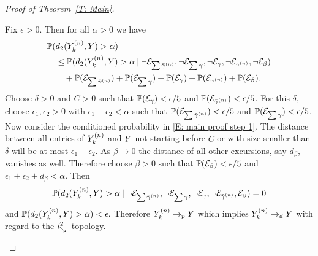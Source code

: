 \begin{proof}[Proof of Theorem~\ref{T: Main}]
\begin{proofpart}
	Fix $\epsilon > 0$. 
	Then for all $\alpha > 0$ we have 
	\begin{equation} \label{E: main proof step 1}
	\begin{aligned}
	&\mathbb{P}( d_{2}(Y^{(n)}_k, Y) > \alpha) \\
	&\quad\leq \mathbb{P}( d_{2}(Y^{(n)}_k, Y) > \alpha \: | \: 
	\neg\mathcal{E}_{\sum\bar{\gamma}^{(n)}}, \neg\mathcal{E}_{\sum\gamma}, \neg\mathcal{E}_{\gamma}, \neg\mathcal{E}_{\bar{\gamma}^{(n)}}, \neg\mathcal{E}_{\beta}) \\
	&\quad\quad + \mathbb{P}(\mathcal{E}_{\sum\bar{\gamma}^{(n)}}) + \mathbb{P}(\mathcal{E}_{\sum\gamma}) + \mathbb{P}(\mathcal{E}_{\gamma}) + \mathbb{P}(\mathcal{E}_{\bar{\gamma}^{(n)}}) + \mathbb{P}(\mathcal{E}_{\beta}).
	\end{aligned}
	\end{equation}
	Choose $\delta > 0$ and $C > 0$ such that $\mathbb{P}(\mathcal{E}_{\gamma}) < \epsilon / 5$ and $\mathbb{P}(\mathcal{E}_{\bar{\gamma}^{(n)}}) < \epsilon / 5$.
	For this $\delta$, choose $\epsilon_1, \epsilon_2 > 0$ with $\epsilon_1 + \epsilon_2 < \alpha$
	such that $\mathbb{P}(\mathcal{E}_{\sum\bar{\gamma}^{(n)}}) < \epsilon / 5$ and $\mathbb{P}(\mathcal{E}_{\sum\gamma}) < \epsilon / 5$.
	Now consider the conditioned probability in \eqref{E: main proof step 1}.
	The distance between all entries of $Y^{(n)}_k$ and $Y$ not starting before $C$ or with size smaller than $\delta$ 
	will be at most $\epsilon_1 + \epsilon_2$.
	As $\beta \rightarrow 0$ the distance of all other excursions, say $d_{\beta}$, vanishes as well.
	Therefore choose $\beta > 0$ such that $\mathbb{P}(\mathcal{E}_{\beta}) < \epsilon / 5$ and $\epsilon_1 + \epsilon_2 + d_{\beta} < \alpha$.
	Then
	\begin{equation}
	\mathbb{P}( d_{2}(Y^{(n)}_k, Y) > \alpha \: | \: 
	\neg\mathcal{E}_{\sum\bar{\gamma}^{(n)}}, \neg\mathcal{E}_{\sum\gamma}, \neg\mathcal{E}_{\gamma}, \neg\mathcal{E}_{\bar{\gamma}^{(n)}}, \mathcal{E}_{\beta}) = 0
	\end{equation}
	and 
	\begin{math}
	\mathbb{P}( d_{2}(Y^{(n)}_k, Y) > \alpha) < \epsilon.
	\end{math}
	Therefore $Y^{(n)}_k \rightarrow_p Y$ which implies ${Y}^{(n)}_k \rightarrow_d {Y}$ with regard to the $\mathit{l}^2_{\searrow}$~topology.
	\end{proofpart}

	
\end{proof}


